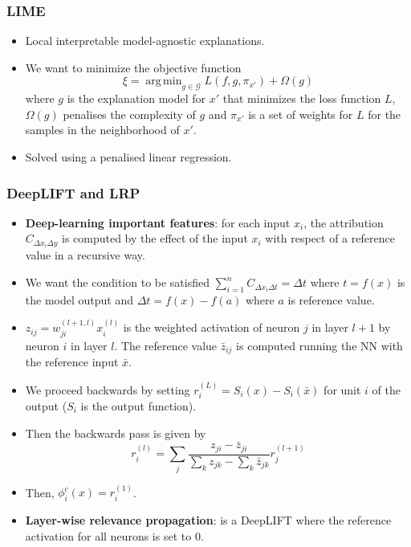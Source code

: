 \documentclass{beamer}
\theoremstyle{plain}
\theoremstyle{definition}
\theoremstyle{remark}
\DeclareMathOperator*{\argmin}{arg\,min}
\begin{document}
\begin{frame}
	\frametitle{LIME}
	\begin{itemize}
		\item Local interpretable model-agnostic explanations.
		\item We want to minimize the objective function
		\begin{equation}
			\xi = \argmin_{g\in \mathcal{G}}L(f,g,\pi_{x'})+\Omega(g)
		\end{equation}
		where $g$ is the explanation model for $x'$ that minimizes the loss function $L$, $\Omega(g)$ penalises the complexity of $g$ and $\pi_{x'}$ is a set of weights for $L$ for the samples in the neighborhood of $x'$.
		\item Solved using a penalised linear regression.
	\end{itemize}
\end{frame}

\begin{frame}
	\frametitle{DeepLIFT and LRP}
	\begin{itemize}
		\item \textbf{Deep-learning important features}: for each input $x_i$, the attribution $C_{\Delta x_i\Delta y}$ is computed by the effect of the input $x_i$ with respect of a reference value in a recursive way.
		\item We want the condition to be satisfied $\sum_{i=1}^{n}{C_{\Delta x_i \Delta t}}=\Delta t$ where $t=f(x)$ is the model output and $\Delta t= f(x)-f(a)$ where $a$ is reference value.
		\item $z_{ij}=w^{(l+1,l)}_{ji}x_i^{(l)}$ is the weighted activation of neuron $j$ in layer $l+1$ by neuron $i$ in layer $l$. The reference value $\bar{z}_{ij}$ is computed running the NN with the reference input $\bar{x}$.
	\end{itemize}
\end{frame}

\begin{frame}
	\begin{itemize}
		\item We proceed backwards by setting $r_i^{(L)}=S_i(x)-S_i(\bar{x})$ for unit $i$ of the output ($S_i$ is the output function).
		\item Then the backwards pass is given by
		\begin{equation}
			r_i^{(l)} = \sum_j\frac{z_{ji}-\bar{z}_{ji}}{\sum_{k}z_{jk}-\sum_{k}{\bar{z}_{jk}}}r_j^{(l+1)}
		\end{equation}
		\item Then, $\phi_i^c(x)=r_i^{(1)}$.
		\item \textbf{Layer-wise relevance propagation}: is a DeepLIFT where the reference activation for all neurons is set to $0$. 
	\end{itemize}
\end{frame}
\end{document}
